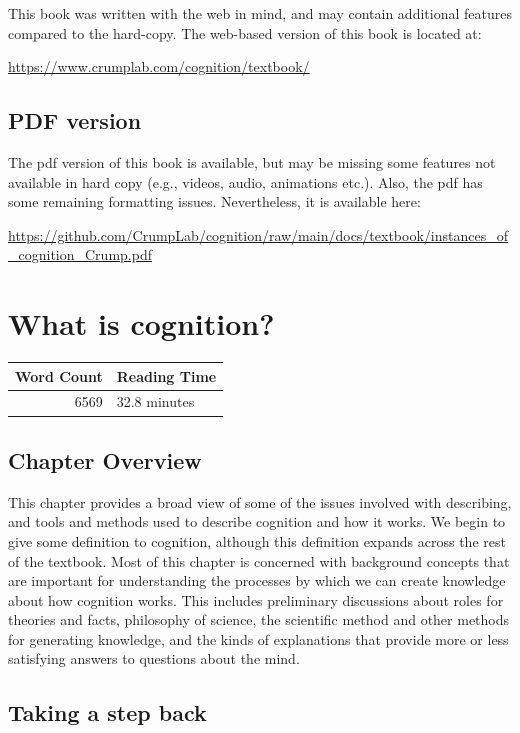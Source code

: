 \documentclass[
  oneside,
  12pt]{crumpbook}
\begin{document}
This book was written with the web in mind, and may contain additional features compared to the hard-copy. The web-based version of this book is located at:

\url{https://www.crumplab.com/cognition/textbook/}

\hypertarget{pdf-version}{%
\section{PDF version}\label{pdf-version}}

The pdf version of this book is available, but may be missing some features not available in hard copy (e.g., videos, audio, animations etc.). Also, the pdf has some remaining formatting issues. Nevertheless, it is available here:

\url{https://github.com/CrumpLab/cognition/raw/main/docs/textbook/instances_of_cognition_Crump.pdf}

\hypertarget{what-is-cognition}{%
\chapter{What is cognition?}\label{what-is-cognition}}

\begin{tabular}{r|l}
\hline
Word Count & Reading Time\\
\hline
6569 & 32.8 minutes\\
\hline
\end{tabular}

\hypertarget{chapter-overview}{%
\section{Chapter Overview}\label{chapter-overview}}

This chapter provides a broad view of some of the issues involved with describing, and tools and methods used to describe cognition and how it works. We begin to give some definition to cognition, although this definition expands across the rest of the textbook. Most of this chapter is concerned with background concepts that are important for understanding the processes by which we can create knowledge about how cognition works. This includes preliminary discussions about roles for theories and facts, philosophy of science, the scientific method and other methods for generating knowledge, and the kinds of explanations that provide more or less satisfying answers to questions about the mind.

\hypertarget{taking-a-step-back}{%
\section{Taking a step back}\label{taking-a-step-back}}
\end{document}
